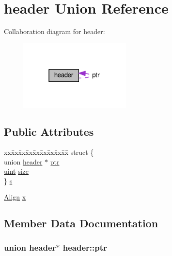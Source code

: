 \hypertarget{unionheader}{}\section{header Union Reference}
\label{unionheader}


Collaboration diagram for header\+:\nopagebreak
\begin{figure}[H]
\begin{center}
\leavevmode
\includegraphics[width=159pt]{df/d0e/unionheader__coll__graph}
\end{center}
\end{figure}
\subsection*{Public Attributes}
\begin{DoxyCompactItemize}
\item 
\begin{tabbing}
xx\=xx\=xx\=xx\=xx\=xx\=xx\=xx\=xx\=\kill
struct \{\\
\>union \hyperlink{unionheader}{header} $\ast$ \hyperlink{unionheader_adcb7a02e18836885c802789f6a6c99fd}{ptr}\\
\>\hyperlink{types_8h_a91ad9478d81a7aaf2593e8d9c3d06a14}{uint} \hyperlink{unionheader_a70db454b20b4a40995532b7ea029a527}{size}\\
\} \hyperlink{unionheader_a3d684c1d6a9465b92eb26550d38ce659}{s}\\

\end{tabbing}\item 
\hyperlink{umalloc_8c_aa508dd61e627680e57643837d292d89f}{Align} \hyperlink{unionheader_a2f321dbb657408f93d0c585f55951bdb}{x}
\end{DoxyCompactItemize}


\subsection{Member Data Documentation}
\subsubsection[{\texorpdfstring{ptr}{ptr}}]{\setlength{\rightskip}{0pt plus 5cm}union {\bf header}$\ast$ header\+::ptr}\hypertarget{unionheader_adcb7a02e18836885c802789f6a6c99fd}{}\label{unionheader_adcb7a02e18836885c802789f6a6c99fd}
